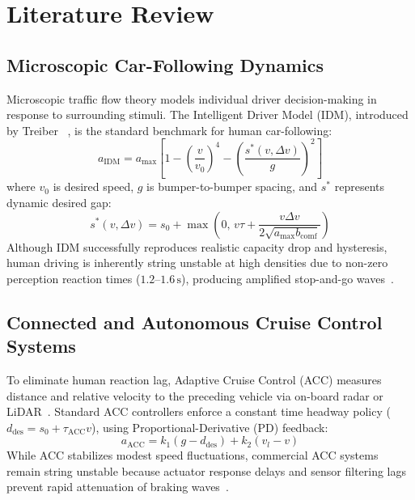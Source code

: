 \documentclass[11pt,a4paper]{article}
\begin{document}
\section{Literature Review}

\subsection{Microscopic Car-Following Dynamics}
Microscopic traffic flow theory models individual driver decision-making in response to surrounding stimuli. The Intelligent Driver Model (IDM), introduced by Treiber \etal~\cite{treiber2000congested}, is the standard benchmark for human car-following:
\begin{equation}
a_{\text{IDM}} = a_{\max} \left[ 1 - \left(\frac{v}{v_0}\right)^4 - \left(\frac{s^*(v, \Delta v)}{g}\right)^2 \right]
\end{equation}
where $v_0$ is desired speed, $g$ is bumper-to-bumper spacing, and $s^*$ represents dynamic desired gap:
\begin{equation}
s^*(v, \Delta v) = s_0 + \max\left(0,\, v\tau + \frac{v \Delta v}{2\sqrt{a_{\max} b_{\text{comf}}}}\right)
\end{equation}
Although IDM successfully reproduces realistic capacity drop and hysteresis, human driving is inherently string unstable at high densities due to non-zero perception reaction times ($1.2\text{--}1.6\,\mathrm{s}$), producing amplified stop-and-go waves~\cite{Gipps1981, PTV2025}.

\subsection{Connected and Autonomous Cruise Control Systems}
To eliminate human reaction lag, Adaptive Cruise Control (ACC) measures distance and relative velocity to the preceding vehicle via on-board radar or LiDAR~\cite{milanes2014modeling, AlHindawi2025}. Standard ACC controllers enforce a constant time headway policy ($d_{\text{des}} = s_0 + \tau_{\text{ACC}} v$), using Proportional-Derivative (PD) feedback:
\begin{equation}
a_{\text{ACC}} = k_1 (g - d_{\text{des}}) + k_2 (v_l - v)
\end{equation}
While ACC stabilizes modest speed fluctuations, commercial ACC systems remain string unstable because actuator response delays and sensor filtering lags prevent rapid attenuation of braking waves~\cite{Gunter2020, Basak2026}.
\end{document}
